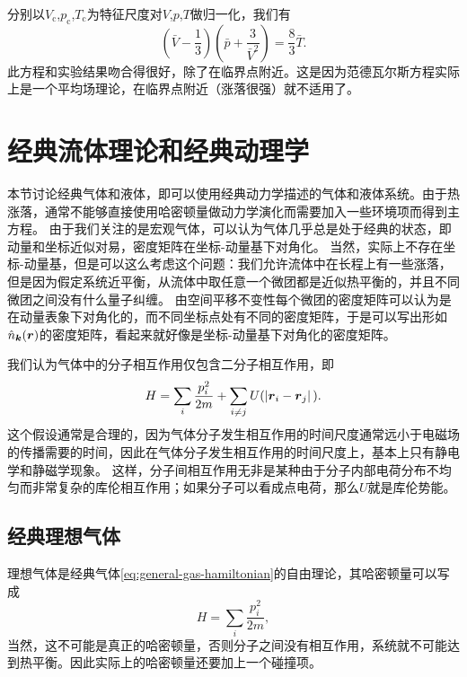 \documentclass[hyperref, UTF8, a4paper]{ctexart}
\begin{document}
分别以$V_\text{c}$,$p_\text{c}$,$T_\text{c}$为特征尺度对$V$,$p$,$T$做归一化，我们有
\begin{equation}
    \left(\bar{V} - \frac{1}{3}\right) \left(\bar{p} + \frac{3}{\bar{V}^2}\right) = \frac{8}{3} \bar{T}. 
\end{equation}
此方程和实验结果吻合得很好，除了在临界点附近。这是因为范德瓦尔斯方程实际上是一个平均场理论，在临界点附近（涨落很强）就不适用了。

\section{经典流体理论和经典动理学}

本节讨论经典气体和液体，即可以使用经典动力学描述的气体和液体系统。由于热涨落，通常不能够直接使用哈密顿量做动力学演化而需要加入一些环境项而得到主方程。
由于我们关注的是宏观气体，可以认为气体几乎总是处于经典的状态，即动量和坐标近似对易，密度矩阵在坐标-动量基下对角化。
当然，实际上不存在坐标-动量基，但是可以这么考虑这个问题：我们允许流体中在长程上有一些涨落，但是因为假定系统近平衡，从流体中取任意一个微团都是近似热平衡的，并且不同微团之间没有什么量子纠缠。
由空间平移不变性每个微团的密度矩阵可以认为是在动量表象下对角化的，而不同坐标点处有不同的密度矩阵，于是可以写出形如$\hat{n}_{\vb*{k}}(\vb*{r})$的密度矩阵，看起来就好像是坐标-动量基下对角化的密度矩阵。

我们认为气体中的分子相互作用仅包含二分子相互作用，即
\begin{equation}
    H = \sum_i \frac{p_i^2}{2m} + \sum_{i \neq j} U(\abs*{\vb*{r}_i - \vb*{r}_j}).
    \label{eq:general-gas-hamiltonian}
\end{equation}
这个假设通常是合理的，因为气体分子发生相互作用的时间尺度通常远小于电磁场的传播需要的时间，因此在气体分子发生相互作用的时间尺度上，基本上只有静电学和静磁学现象。
这样，分子间相互作用无非是某种由于分子内部电荷分布不均匀而非常复杂的库伦相互作用；如果分子可以看成点电荷，那么$U$就是库伦势能。

\subsection{经典理想气体}

理想气体是经典气体\eqref{eq:general-gas-hamiltonian}的自由理论，其哈密顿量可以写成
\begin{equation}
    H = \sum_i \frac{p_i^2}{2m},
\end{equation}
当然，这不可能是真正的哈密顿量，否则分子之间没有相互作用，系统就不可能达到热平衡。因此实际上的哈密顿量还要加上一个碰撞项。
\end{document}
